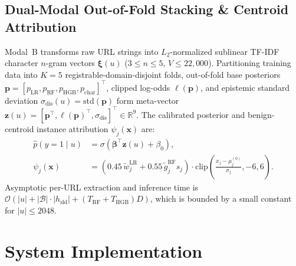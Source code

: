\documentclass[12pt,a4paper]{report}
\begin{document}
\section{Dual-Modal Out-of-Fold Stacking \& Centroid Attribution}
Modal~B transforms raw URL strings into $L_2$-normalized sublinear TF-IDF character $n$-gram vectors $\boldsymbol{\xi}(u)$ ($3 \le n \le 5$, $V \le 22{,}000$). Partitioning training data into $K=5$ registrable-domain-disjoint folds, out-of-fold base posteriors $\mathbf{p} = [p_{\text{LR}}, p_{\text{RF}}, p_{\text{HGB}}, p_{\text{char}}]^\top$, clipped log-odds $\ell(\mathbf{p})$, and epistemic standard deviation $\sigma_{\text{dis}}(u) = \text{std}(\mathbf{p})$ form meta-vector $\mathbf{z}(u) = [\mathbf{p}^\top, \ell(\mathbf{p})^\top, \sigma_{\text{dis}}]^\top \in \mathbb{R}^9$. The calibrated posterior and benign-centroid instance attribution $\psi_j(\mathbf{x})$ are:
\begin{align}
\hat{p}(y=1 \mid u) &= \sigma\!\left(\boldsymbol{\beta}^\top \mathbf{z}(u) + \beta_0\right), \\
\psi_j(\mathbf{x}) &= \left(0.45\,\tilde{w}_j^{\text{LR}} + 0.55\,\tilde{g}_j^{\text{RF}} s_j\right) \cdot \text{clip}\!\left(\frac{x_j - \mu_j^{(0)}}{\sigma_j}, -6, 6\right).
\end{align}
Asymptotic per-URL extraction and inference time is $\mathcal{O}(|u| + |\mathcal{B}|\cdot|h_{\text{sld}}| + (T_{\text{RF}}+T_{\text{HGB}})D)$, which is bounded by a small constant for $|u| \le 2048$.

\chapter{System Implementation}
\end{document}
